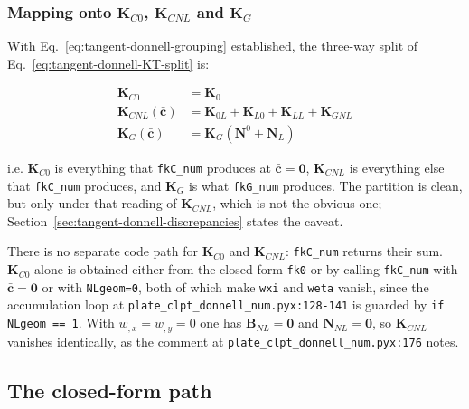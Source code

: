 \subsubsection{Mapping onto $\boldsymbol{K}_{C0}$, $\boldsymbol{K}_{CNL}$ and $\boldsymbol{K}_G$}

With Eq.~\ref{eq:tangent-donnell-grouping} established, the three-way split of Eq.~\ref{eq:tangent-donnell-KT-split} is:

\begin{equation}\label{eq:tangent-donnell-three-way}
	\begin{aligned}
		\boldsymbol{K}_{C0} &= \boldsymbol{K}_0 \\
		\boldsymbol{K}_{CNL}(\bar{\boldsymbol{c}}) &= \boldsymbol{K}_{0L} + \boldsymbol{K}_{L0} + \boldsymbol{K}_{LL} + \boldsymbol{K}_{GNL} \\
		\boldsymbol{K}_G(\bar{\boldsymbol{c}}) &= \boldsymbol{K}_G(\boldsymbol{N}^0 + \boldsymbol{N}_L)
	\end{aligned}
\end{equation}

\noindent i.e. $\boldsymbol{K}_{C0}$ is everything that \texttt{fkC\_num} produces at $\bar{\boldsymbol{c}} = \boldsymbol{0}$, $\boldsymbol{K}_{CNL}$ is everything else that \texttt{fkC\_num} produces, and $\boldsymbol{K}_G$ is what \texttt{fkG\_num} produces. The partition is clean, but only under that reading of $\boldsymbol{K}_{CNL}$, which is not the obvious one; Section~\ref{sec:tangent-donnell-discrepancies} states the caveat.

There is no separate code path for $\boldsymbol{K}_{C0}$ and $\boldsymbol{K}_{CNL}$: \texttt{fkC\_num} returns their sum. $\boldsymbol{K}_{C0}$ alone is obtained either from the closed-form \texttt{fk0} or by calling \texttt{fkC\_num} with $\bar{\boldsymbol{c}} = \boldsymbol{0}$ or with \texttt{NLgeom=0}, both of which make \texttt{wxi} and \texttt{weta} vanish, since the accumulation loop at \texttt{plate\_clpt\_donnell\_num.pyx:128-141} is guarded by \texttt{if NLgeom == 1}. With $w_{,x} = w_{,y} = 0$ one has $\boldsymbol{B}_{NL} = \boldsymbol{0}$ and $\boldsymbol{N}_{NL} = \boldsymbol{0}$, so $\boldsymbol{K}_{CNL}$ vanishes identically, as the comment at \texttt{plate\_clpt\_donnell\_num.pyx:176} notes.

\subsection{The closed-form path}\label{sec:tangent-donnell-closed-form}

